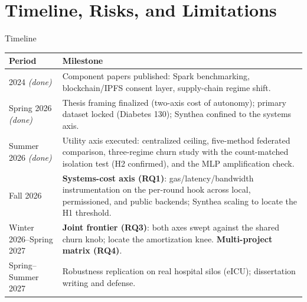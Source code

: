 \documentclass[aspectratio=169, 11pt]{beamer}
\begin{document}
\section{Timeline, Risks, and Limitations}

\begin{frame}{Timeline}
\begin{center}\scriptsize
\begin{tabular}{p{2.5cm}p{9.6cm}}
\toprule
\textbf{Period} & \textbf{Milestone}\\
\midrule
2024 \textcolor{mTeal}{\emph{(done)}} &
  Component papers published: Spark benchmarking, blockchain/IPFS consent
  layer, supply-chain regime shift.\\
\addlinespace
Spring 2026 \textcolor{mTeal}{\emph{(done)}} &
  Thesis framing finalized (two-axis cost of autonomy); primary dataset locked
  (Diabetes 130); Synthea confined to the systems axis.\\
\addlinespace
Summer 2026 \textcolor{mTeal}{\emph{(done)}} &
  Utility axis executed: centralized ceiling, five-method federated
  comparison, three-regime churn study with the count-matched isolation test
  (H2 confirmed), and the MLP amplification check.\\
\midrule
Fall 2026 &
  \textbf{Systems-cost axis (RQ1)}: gas/latency/bandwidth instrumentation on
  the per-round hook across local, permissioned, and public backends; Synthea
  scaling to locate the H1 threshold.\\
\addlinespace
Winter 2026--\newline Spring 2027 &
  \textbf{Joint frontier (RQ3)}: both axes swept against the shared churn
  knob; locate the amortization knee. \textbf{Multi-project matrix (RQ4)}.\\
\addlinespace
Spring--\newline Summer 2027 &
  Robustness replication on real hospital silos (eICU); dissertation writing
  and defense.\\
\bottomrule
\end{tabular}
\end{center}
\end{frame}
\end{document}
